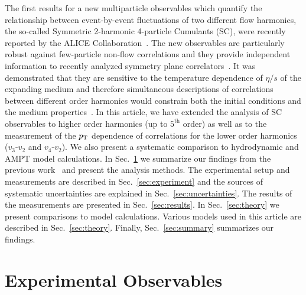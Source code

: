 The first results for a new multiparticle observables which quantify the relationship between event-by-event fluctuations of two different flow harmonics, the so-called Symmetric 2-harmonic 4-particle Cumulants (SC), were recently reported by the ALICE Collaboration~\cite{ALICE:2016kpq}.
The new observables are particularly robust against few-particle non-flow correlations and they provide independent information to recently analyzed symmetry plane correlators~\cite{Aad:2014fla}. 
It was demonstrated that they are sensitive to the temperature dependence of $\eta/s$ of the expanding medium and therefore simultaneous descriptions of correlations between different order harmonics would constrain both the initial conditions and the medium properties~\cite{ALICE:2016kpq,Zhu:2016puf}.
In this article, we have extended the analysis of SC observables to higher order harmonics (up to $5^{\mathrm{th}}$ order) as well as to the measurement of the $p_{\rm T}$ dependence of correlations for the lower order harmonics ($v_3$-$v_2$ and $v_4$-$v_2$).  We also present a systematic comparison to hydrodynamic and AMPT model calculations.
In Sec.~\ref{sec:method} we summarize our findings from the previous work~\cite{ALICE:2016kpq} and present the analysis methods. The experimental setup and measurements are described in Sec.~\ref{sec:experiment} and the sources of systematic uncertainties are explained in Sec.~\ref{sec:uncertainties}. The results of the measurements are presented in Sec.~\ref{sec:results}. 
 In Sec.~\ref{sec:theory} we present comparisons to model calculations. Various models used in this article are described in Sec.~\ref{sec:theory}. Finally, Sec.~\ref{sec:summary} summarizes our findings.
 
 

\section{Experimental Observables}
\label{sec:method}

